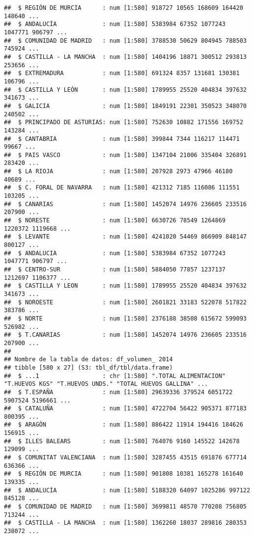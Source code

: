 \documentclass[
]{article}
\begin{document}
\begin{verbatim}
##  $ REGIÓN DE MURCIA      : num [1:580] 918727 10565 168609 164420 148640 ...
##  $ ANDALUCÍA             : num [1:580] 5383984 67352 1077243 1047771 906797 ...
##  $ COMUNIDAD DE MADRID   : num [1:580] 3788530 50629 804945 788503 745924 ...
##  $ CASTILLA - LA MANCHA  : num [1:580] 1404196 18871 300512 293813 253656 ...
##  $ EXTREMADURA           : num [1:580] 691324 8357 131681 130381 106796 ...
##  $ CASTILLA Y LEÓN       : num [1:580] 1789955 25520 404834 397632 341673 ...
##  $ GALICIA               : num [1:580] 1849191 22301 350523 348070 240502 ...
##  $ PRINCIPADO DE ASTURIAS: num [1:580] 752630 10882 171556 169752 143284 ...
##  $ CANTABRIA             : num [1:580] 399844 7344 116217 114471 99667 ...
##  $ PAIS VASCO            : num [1:580] 1347104 21006 335404 326891 283420 ...
##  $ LA RIOJA              : num [1:580] 207928 2973 47966 46180 40689 ...
##  $ C. FORAL DE NAVARRA   : num [1:580] 421312 7185 116086 111551 103205 ...
##  $ CANARIAS              : num [1:580] 1452074 14976 236605 233516 207900 ...
##  $ NORESTE               : num [1:580] 6630726 78549 1264869 1220372 1119668 ...
##  $ LEVANTE               : num [1:580] 4241020 54469 866909 848147 800127 ...
##  $ ANDALUCIA             : num [1:580] 5383984 67352 1077243 1047771 906797 ...
##  $ CENTRO-SUR            : num [1:580] 5884050 77857 1237137 1212697 1106377 ...
##  $ CASTILLA Y LEON       : num [1:580] 1789955 25520 404834 397632 341673 ...
##  $ NOROESTE              : num [1:580] 2601821 33183 522078 517822 383786 ...
##  $ NORTE                 : num [1:580] 2376188 38508 615672 599093 526982 ...
##  $ T.CANARIAS            : num [1:580] 1452074 14976 236605 233516 207900 ...
##  
## Nombre de la tabla de datos: df_volumen_ 2014 
## tibble [580 x 27] (S3: tbl_df/tbl/data.frame)
##  $ ...1                  : chr [1:580] ".TOTAL ALIMENTACION" "T.HUEVOS KGS" "T.HUEVOS UNDS." "TOTAL HUEVOS GALLINA" ...
##  $ T.ESPAÑA              : num [1:580] 29639336 379524 6051722 5907524 5196661 ...
##  $ CATALUÑA              : num [1:580] 4722704 56422 905371 877183 800395 ...
##  $ ARAGÓN                : num [1:580] 886422 11914 194416 184626 156915 ...
##  $ ILLES BALEARS         : num [1:580] 764076 9160 145522 142678 129099 ...
##  $ COMUNITAT VALENCIANA  : num [1:580] 3287455 43515 691876 677714 636366 ...
##  $ REGIÓN DE MURCIA      : num [1:580] 901808 10381 165278 161640 139335 ...
##  $ ANDALUCÍA             : num [1:580] 5188320 64097 1025286 997122 845128 ...
##  $ COMUNIDAD DE MADRID   : num [1:580] 3699811 48570 770208 756805 713244 ...
##  $ CASTILLA - LA MANCHA  : num [1:580] 1362260 18037 289816 280353 238072 ...

\end{verbatim}
\end{document}
